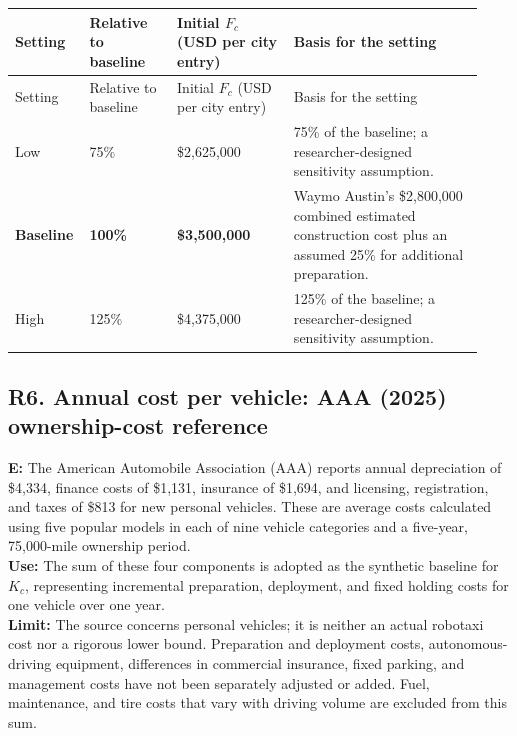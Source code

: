 \documentclass[10pt,a4paper]{article}
\begin{document}
\begingroup
\small
\setlength{\tabcolsep}{4pt}
\renewcommand{\arraystretch}{1.2}
\begin{longtable}{@{}
P{0.12\linewidth}
P{0.18\linewidth}
P{0.24\linewidth}
P{0.39\linewidth}
@{}}
\toprule
Setting & Relative to baseline & Initial $F_c$ \newline (USD per city entry) & Basis for the setting \\
\midrule
\endfirsthead
\toprule
Setting & Relative to baseline & Initial $F_c$ \newline (USD per city entry) & Basis for the setting \\
\midrule
\endhead

Low & 75\% & \$2,625,000
& 75\% of the baseline; a researcher-designed sensitivity assumption. \\
\addlinespace

\textbf{Baseline} & \textbf{100\%} & \textbf{\$3,500,000}
& Waymo Austin's \$2,800,000 combined estimated construction cost plus an assumed 25\% for additional preparation. \\
\addlinespace

High & 125\% & \$4,375,000
& 125\% of the baseline; a researcher-designed sensitivity assumption. \\
\bottomrule
\end{longtable}
\endgroup
\noindent


\subsection*{\hypertarget{rationale-R6}{R6. Annual cost per vehicle: AAA (2025) ownership-cost reference}}

\noindent
\textbf{E:}
The American Automobile Association (AAA) reports annual depreciation of \$4,334, finance costs of \$1,131, insurance of \$1,694, and licensing, registration, and taxes of \$813 for new personal vehicles. These are average costs calculated using five popular models in each of nine vehicle categories and a five-year, 75,000-mile ownership period. \\
\textbf{Use:}
The sum of these four components is adopted as the synthetic baseline for $K_c$, representing incremental preparation, deployment, and fixed holding costs for one vehicle over one year. \\
\textbf{Limit:}
The source concerns personal vehicles; it is neither an actual robotaxi cost nor a rigorous lower bound. Preparation and deployment costs, autonomous-driving equipment, differences in commercial insurance, fixed parking, and management costs have not been separately adjusted or added. Fuel, maintenance, and tire costs that vary with driving volume are excluded from this sum.
\end{document}
